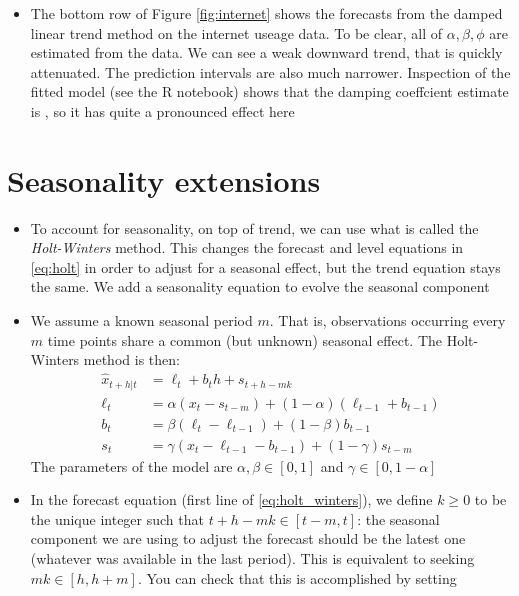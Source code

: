 \documentclass{article}
\begin{document}
\begin{itemize}
\item The bottom row of Figure \ref{fig:internet} shows the forecasts from the
  damped linear trend method on the internet useage data. To be clear, all of 
  $\alpha,\beta,\phi$ are estimated from the data. We can see a weak downward
  trend, that is quickly attenuated. The prediction intervals are also much 
  narrower. Inspection of the fitted model (see the R notebook) shows that the
  damping coeffcient estimate is , so it has quite a
  pronounced effect here 
\end{itemize}

\section{Seasonality extensions}

\begin{itemize}
\item To account for seasonality, on top of trend, we can use what is called the   
  \emph{Holt-Winters} method. This changes the forecast and level equations in
  \eqref{eq:holt} in order to adjust for a seasonal effect, but the trend
  equation stays the same. We add a seasonality equation to evolve the seasonal
  component    

\item We assume a known seasonal period $m$. That is, observations occurring
  every $m$ time points share a common (but unknown) seasonal effect. The
  Holt-Winters method is then:  
  \begin{equation}
  \label{eq:holt_winters}
  \begin{aligned}
  \hat{x}_{t+h | t} &= \ell_t + b_t h + s_{t+h-mk} \\  
  \ell_t &= \alpha (x_t - s_{t-m}) + (1-\alpha) (\ell_{t-1} + b_{t-1}) \\ 
  b_t &= \beta (\ell_t - \ell_{t-1}) + (1-\beta) b_{t-1} \\
  s_t &= \gamma (x_t - \ell_{t-1} - b_{t-1}) + (1-\gamma) s_{t-m} 
  \end{aligned}
  \end{equation}
  The parameters of the model are $\alpha, \beta \in [0,1]$ and $\gamma \in [0,
  1-\alpha]$ 

\item In the forecast equation (first line of \eqref{eq:holt_winters}), we
  define $k \geq 0$ to be the unique integer such that $t+h-mk \in [t-m, t]$:
  the seasonal component we are using to adjust the forecast should be the
  latest one (whatever was available in the last period). This is equivalent to
  seeking $mk \in [h, h+m]$. You can check that this is accomplished by setting


\end{itemize}
\end{document}
